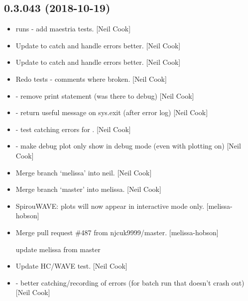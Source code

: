 \documentclass[a4paper,10pt,english]{report}
\begin{document}
\subsection{0.3.043 (2018-10-19)}
\label{\detokenize{misc/changelog:id287}}\begin{itemize}
\item {} 
 runs - add maestria tests. {[}Neil Cook{]}

\item {} 
Update  to catch and handle errors better. {[}Neil
Cook{]}

\item {} 
Update  to catch and handle errors better. {[}Neil
Cook{]}

\item {} 
Redo tests - comments where broken. {[}Neil Cook{]}

\item {} 
 - remove print statement (was there to debug) {[}Neil
Cook{]}

\item {} 
 - return useful message on sys.exit (after error log)
{[}Neil Cook{]}

\item {} 
 - test catching errors for . {[}Neil
Cook{]}

\item {} 
 - make debug plot only show in debug mode (even with
plotting on) {[}Neil Cook{]}

\item {} 
Merge branch ‘melissa’ into neil. {[}Neil Cook{]}

\item {} 
Merge branch ‘master’ into melissa. {[}Neil Cook{]}

\item {} 
SpirouWAVE: plots will now appear in interactive mode only. {[}melissa-
hobson{]}

\item {} 
Merge pull request \#487 from njcuk9999/master. {[}melissa-hobson{]}

update melissa from master

\item {} 
Update HC/WAVE test. {[}Neil Cook{]}

\item {} 
 - better catching/recording of errors (for batch run that
doesn’t crash out) {[}Neil Cook{]}


\end{itemize}
\end{document}
